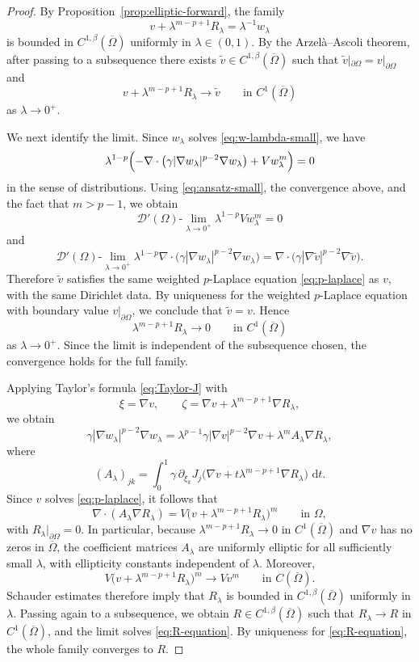 \documentclass[a4paper,12pt]{article}
\newcommand{\pr}{\partial}
\newcommand{\dd}{\,\mathrm{d}}
\theoremstyle{definition}
\theoremstyle{remark}
\begin{document}
\begin{proof}
By Proposition~\ref{prop:elliptic-forward}, the family
\[
v+\lambda^{m-p+1}R_\lambda=\lambda^{-1}w_\lambda
\]
is bounded in $C^{1,\beta}(\overline\Omega)$ uniformly in $\lambda\in(0,1)$. By the Arzel\`a--Ascoli theorem, after passing to a subsequence there exists $\tilde v\in C^{1,\beta}(\overline\Omega)$ such that $\tilde v|_{\pr\Omega}=v|_{\pr\Omega}$ and
\[
v+\lambda^{m-p+1}R_\lambda\to \tilde v
\qquad\text{in }C^1(\overline\Omega)
\]
as $\lambda\to0^+$.

We next identify the limit. Since $w_\lambda$ solves \eqref{eq:w-lambda-small}, we have
\[
\lambda^{1-p}\Bigl(-\nabla\cdot\bigl(\gamma|\nabla w_\lambda|^{p-2}\nabla w_\lambda\bigr)+Vw_\lambda^m\Bigr)=0
\]
in the sense of distributions. Using \eqref{eq:ansatz-small}, the convergence above, and the fact that $m>p-1$, we obtain
\[
\mathscr D'(\Omega)\text{-}\lim_{\lambda\to0^+}\lambda^{1-p}Vw_\lambda^m=0
\]
and
\[
\mathscr D'(\Omega)\text{-}\lim_{\lambda\to0^+}\lambda^{1-p}\nabla\cdot\bigl(\gamma|\nabla w_\lambda|^{p-2}\nabla w_\lambda\bigr)
=\nabla\cdot\bigl(\gamma|\nabla\tilde v|^{p-2}\nabla\tilde v\bigr).
\]
Therefore $\tilde v$ satisfies the same weighted $p$-Laplace equation \eqref{eq:p-laplace} as $v$, with the same Dirichlet data. By uniqueness for the weighted $p$-Laplace equation with boundary value $v|_{\pr\Omega}$, we conclude that $\tilde v=v$. Hence
\[
\lambda^{m-p+1}R_\lambda\to0
\qquad\text{in }C^1(\overline\Omega)
\]
as $\lambda\to0^+$. Since the limit is independent of the subsequence chosen, the convergence holds for the full family.

Applying Taylor's formula \eqref{eq:Taylor-J} with
\[
\xi=\nabla v,
\qquad
\zeta=\nabla v+\lambda^{m-p+1}\nabla R_\lambda,
\]
we obtain
\[
\gamma|\nabla w_\lambda|^{p-2}\nabla w_\lambda
=\lambda^{p-1}\gamma|\nabla v|^{p-2}\nabla v+\lambda^m A_\lambda\nabla R_\lambda,
\]
where
\[
(A_\lambda)_{jk}=\int_0^1\gamma\,\pr_{\xi_k}J_j\bigl(\nabla v+t\lambda^{m-p+1}\nabla R_\lambda\bigr)\,\dd t.
\]
Since $v$ solves \eqref{eq:p-laplace}, it follows that
\[
\nabla\cdot(A_\lambda\nabla R_\lambda)=V\bigl(v+\lambda^{m-p+1}R_\lambda\bigr)^m
\qquad\text{in }\Omega,
\]
with $R_\lambda|_{\pr\Omega}=0$. In particular, because $\lambda^{m-p+1}R_\lambda\to0$ in $C^1(\overline\Omega)$ and $\nabla v$ has no zeros in $\overline\Omega$, the coefficient matrices $A_\lambda$ are uniformly elliptic for all sufficiently small $\lambda$, with ellipticity constants independent of $\lambda$. Moreover,
\[
V\bigl(v+\lambda^{m-p+1}R_\lambda\bigr)^m\to Vv^m
\qquad\text{in }C(\overline\Omega).
\]
Schauder estimates therefore imply that $R_\lambda$ is bounded in $C^{1,\beta}(\overline\Omega)$ uniformly in $\lambda$. Passing again to a subsequence, we obtain $R\in C^{1,\beta}(\overline\Omega)$ such that $R_\lambda\to R$ in $C^1(\overline\Omega)$, and the limit solves \eqref{eq:R-equation}. By uniqueness for \eqref{eq:R-equation}, the whole family converges to $R$.


\end{proof}
\end{document}

